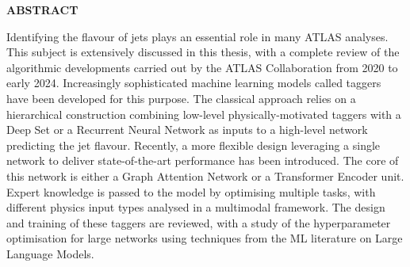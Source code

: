 
\vspace*{\fill}
\begin{center}
\textbf{\large \color{oxfordblue} ABSTRACT}
\end{center}
Identifying the flavour of jets plays an essential role in many ATLAS analyses. This subject is extensively discussed in this thesis, with a complete review of the algorithmic developments carried out by the ATLAS Collaboration from 2020 to early 2024. Increasingly sophisticated machine learning models called taggers have been developed for this purpose. The classical approach relies on a hierarchical construction combining low-level physically-motivated taggers with a Deep Set or a Recurrent Neural Network as inputs to a high-level network predicting the jet flavour. Recently, a more flexible design leveraging a single network to deliver state-of-the-art performance has been introduced. The core of this network is either a Graph Attention Network or a Transformer Encoder unit. Expert knowledge is passed to the model by optimising multiple tasks, with different physics input types analysed in a multimodal framework. The design and training of these taggers are reviewed, with a study of the hyperparameter optimisation for large networks using techniques from the ML literature on Large Language Models. \\


